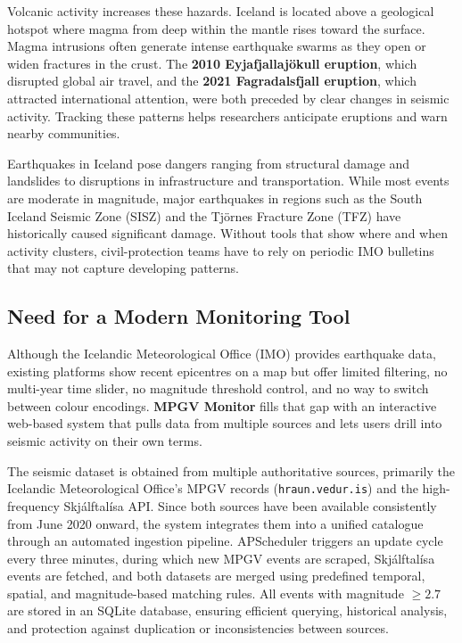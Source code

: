 \documentclass[12pt]{article}
\begin{document}
Volcanic activity increases these hazards. Iceland is located above a geological hotspot where magma from deep within the mantle rises toward the surface. Magma intrusions often generate intense earthquake swarms as they open or widen fractures in the crust. The \textbf{2010 Eyjafjallajökull eruption}, which disrupted global air travel, and the \textbf{2021 Fagradalsfjall eruption}, which attracted international attention, were both preceded by clear changes in seismic activity. Tracking these patterns helps researchers anticipate eruptions and warn nearby communities.


Earthquakes in Iceland pose dangers ranging from structural damage and landslides to disruptions in infrastructure and transportation. While most events are moderate in magnitude, major earthquakes in regions such as the South Iceland Seismic Zone (SISZ) and the Tjörnes Fracture Zone (TFZ) have historically caused significant damage. Without tools that show where and when activity clusters, civil-protection teams have to rely on periodic IMO bulletins that may not capture developing patterns.

\subsection*{Need for a Modern Monitoring Tool}
Although the Icelandic Meteorological Office (IMO) provides earthquake data, existing platforms show recent epicentres on a map but offer limited filtering, no multi-year time slider, no magnitude threshold control, and no way to switch between colour encodings. \textbf{MPGV Monitor} fills that gap with an interactive web-based system that pulls data from multiple sources and lets users drill into seismic activity on their own terms.

The seismic dataset is obtained from multiple authoritative sources, primarily the Icelandic Meteorological Office’s MPGV records (\texttt{hraun.vedur.is}) and the high-frequency Skjálftalísa API. Since both sources have been available consistently from June 2020 onward, the system integrates them into a unified catalogue through an automated ingestion pipeline. APScheduler triggers an update cycle every three minutes, during which new MPGV events are scraped, Skjálftalísa events are fetched, and both datasets are merged using predefined temporal, spatial, and magnitude-based matching rules. All events with magnitude $\geq 2.7$ are stored in an SQLite database, ensuring efficient querying, historical analysis, and protection against duplication or inconsistencies between sources.
\end{document}
